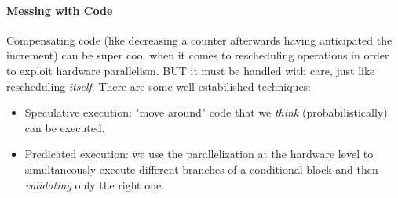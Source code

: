 \documentclass[10pt,a4paper]{article}
\begin{document}
					\paragraph{Messing with Code}
						Compensating code (like decreasing a counter afterwards having anticipated the increment) can be super cool when it comes to rescheduling operations in order to exploit hardware parallelism. BUT it must be handled with care, just like rescheduling \emph{itself}. There are some well estabilished techniques:
						\begin{itemize}
							\item Speculative execution: "move around" code that we \emph{think} (probabilistically) can be executed.
							\item Predicated execution: we use the parallelization at the hardware level to simultaneously execute different branches of a conditional block and then \emph{validating} only the right one.
						\end{itemize}
				
			 	
\end{document}
